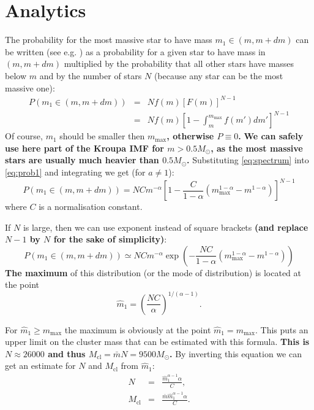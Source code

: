 \documentclass{aastex}
\newcommand{\MSun}{M_\odot}
\newcommand{\Mmax}{m_{\mathrm{max}}}
\newcommand{\Mcl}{M_{\mathrm{cl}}}
\begin{document}
\section{\textbf{Analytics}}
The probability for the most massive star to have mass $m_1 \in (m, m+dm)$ can be written (see e.g. \citep{OrderStat}) as a probability for a given star to have mass in $(m, m+dm)$ multiplied by the probability that all other stars have masses below $m$ and by the number of stars $N$ (because any star can be the most massive one):
\begin{eqnarray}
 P(m_1 \in (m, m+dm)) &=& N f(m) \left[ F(m) \right]^{N-1} \nonumber \\ 
    &=& N f(m) \left[ 1 - \int_m^{\Mmax} f(m')dm' \right]^{N-1} \label{eq:prob1}
\end{eqnarray} 
Of course, $m_1$ should be smaller then $\Mmax$\textbf{, otherwise $P \equiv 0$.}
\textbf{
We can safely use here part of the Kroupa IMF for $m > 0.5 \MSun$, as the most massive stars are usually much heavier than $0.5 \MSun$.}
Substituting \ref{eq:spectrum} into \ref{eq:prob1} and integrating we get (for $a \neq 1$):
\begin{equation}
  P(m_1 \in (m, m+dm)) = N C m^{-\alpha} \left[ 1 - \frac{C}{1-\alpha} \left( \Mmax^{1-\alpha} - m^{1-\alpha} \right) \right]^{N-1} 
\end{equation} 
where $C$ is a normalisation constant. 

If $N$ is large, then we can use exponent instead of square brackets \textbf{(and replace $N-1$ by $N$ for the sake of simplicity)}:
\begin{equation} \label{eq:p_1st}
 P(m_1 \in (m, m+dm)) \simeq N C m^{-\alpha} \exp \left( -\frac{N C}{1-\alpha} \left( \Mmax^{1-\alpha} - m^{1-\alpha} \right)\right)
\end{equation} 
\textbf{The maximum} of this distribution (or the mode of distribution) is located at the point
\begin{equation}
 \hat{m}_1 = \left(\frac{NC}{\alpha}\right)^{1/(\alpha-1)}.
\end{equation} 

For $\hat{m}_1 \geq \Mmax$ the maximum is obviously at the point $\hat{m}_1 = \Mmax$. 
This puts an upper limit on the cluster mass that can be estimated with this formula. \textbf{This is $N \approx 26000$ and thus
$\Mcl = \bar{m} N = 9500 \MSun$.} By inverting this equation we can get an estimate for $N$ and $\Mcl$ from $\hat{m}_1$:
\begin{eqnarray}
  N &=& \frac{\hat{m}_1^{\alpha-1} \alpha}{C}, \nonumber \\ 
  \Mcl &=& \frac{\bar{m} \hat{m}_1^{\alpha-1} \alpha}{C}. \label{eq:mhat_est}
\end{eqnarray} 
\end{document}
